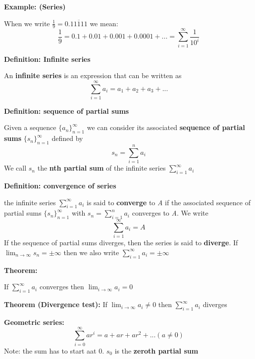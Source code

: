 \documentclass{article}
\begin{document}
\textbf{Example: (Series)}

When we write \(\frac{1}{9} = 0.\overline{11111}\) we mean:
\begin{equation}
    \frac{1}{9} = 0.1 + 0.01 + 0.001 + 0.0001 + ... = \sum^{\infty}_{i=1}\frac{1}{10^i}
\end{equation}

\textbf{Definition: Infinite series}

An \textbf{infinite series} is an expression that can be written as 
\begin{equation}
    \sum^{\infty}_{i=1}a_i = a_1 + a_2 + a_3 + ...
\end{equation}

\textbf{Definition: sequence of partial sums}

Given a sequence \(\{a_n\}^{\infty}_{n=1}\) we can consider its associated \textbf{sequence of partial sums} \(\{s_n\}^{\infty}_{n=1}\) defined by
\begin{equation}
    s_n = \sum^{n}_{i=1}a_i
\end{equation}
We call \(s_n\) the \textbf{nth partial sum} of the infinite series \(\sum^{\infty}_{i=1}a_i\)

\vspace{\baselineskip}
\textbf{Definition: convergence of series}

the infinite series \(\sum^{\infty}_{i=1}a_i\) is said to \textbf{converge} to \textit{A} if the associated sequence of partial sums \(\{s_n\}^{\infty}_{n=1}\) with \(s_n = \sum^{n}_{i=1}a_i\) converges to \textit{A}. We write
\begin{equation}
    \sum^{\infty}_{i=1}a_i = A
\end{equation}
If the sequence of partial sums diverges, then the series is said to \textbf{diverge}. If \(\lim_{n\to\infty}s_n = \pm \infty\) then we also write \(\sum^{\infty}_{i=1}a_i = \pm\infty\)

\vspace{\baselineskip}
\textbf{Theorem:}

If \(\sum^{\infty}_{i=1}a_i\) converges then \(\lim_{i\to\infty}a_i = 0\)

\vspace{\baselineskip}
\textbf{Theorem (Divergence test):}
If \(\lim_{i\to\infty}a_i \neq 0\) then \(\sum^{\infty}_{i=1}a_i\) diverges

\vspace{\baselineskip}
\textbf{Geometric series:}
\begin{equation}
    \sum^{\infty}_{i=0}ar^i = a + ar + ar^2 + ... (a \neq 0)
\end{equation}
Note: the sum has to start aat 0.
\(s_0\) is the \textbf{zeroth partial sum}
\end{document}
